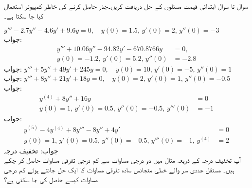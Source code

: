 سوال  تا سوال  ابتدائی قیمت مسئلوں کے حل دریافت کریں۔جذر حاصل کرنے کی خاطر کمپیوٹر استعمال کیا جا سکتا ہے۔

\quad
$y'''-2.7y''-4.6y'+9.6y=0,\quad y(0)=1.5, \,y'(0)=2, \, y''(0)=-3$\\
جواب:
\begin{align*}
y'''+10.06y''-94.82y'-670.8766y&=0,\\
 y(0)=-1.2,\, y'(0)=5.2, \, y''(0)&=-2.8
\end{align*}
جواب:
\quad
$y'''+5y''+49y'+245y=0,\quad y(0)=10, \,y'(0)=-5, \, y''(0)=1$\\
جواب:
\quad
$y'''+8y''+21y'+18y=0,\quad y(0)=2, \,y'(0)=1, \, y''(0)=-0.5$\\
جواب:
\begin{align*}
y^{(4)}+8y''+16y&=0 \\
y(0)=1, \,y'(0)=0.5, \, y''(0)=-0.5,\, y'''(0)&=-1
\end{align*}
جواب:
\begin{align*}
y^{(5)}-4y^{(4)}+8y'''-8y''+4y'&=0 \\
y(0)=1, \,y'(0)=0.5, \, y''(0)=-0.5,\, y'''(0)=-1, \, y^{(4)}&=2
\end{align*}
جواب:
\quad تخفیف درجہ\\
آپ تخفیف درجہ کے ذریعہ مثال  میں دو درجی مساوات سے  کم درجی تفرقی مساوات حاصل کر چکے ہیں۔ مستقل عددی سر والے خطی متجانس سادہ تفرقی مساوات کا ایک حل  جانتے ہوئے کم درجی مساوات کیسے حاصل کی جا سکتی ہے؟

